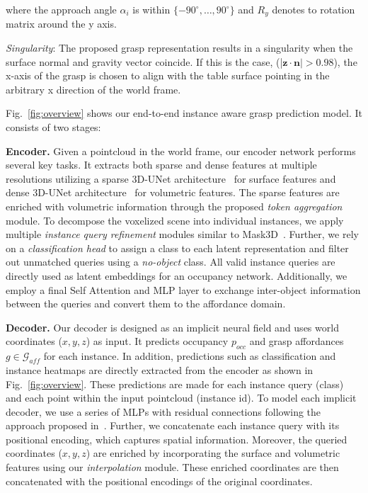 \documentclass[letterpaper, 10 pt, conference]{ieeeconf}  %
\begin{document}
where the approach angle $\alpha_i$ is within $\{-90^\circ, \dots, 90^\circ\}$ and $R_y$ denotes to rotation matrix around the y axis.

\emph{Singularity}: The proposed grasp representation results in a singularity when the surface normal and gravity vector coincide. If this is the case, (|$\mathbf{z} \cdot \mathbf{n}| > 0.98$), the x-axis of the grasp is chosen to align with the table surface pointing in the arbitrary x direction of the world frame.




\label{sec:model-arch}
Fig.~\ref{fig:overview} shows our end-to-end instance aware grasp prediction model. It consists of two stages: 

\noindent\textbf{Encoder.}
Given a pointcloud in the world frame, our encoder network performs several key tasks. It extracts both sparse and dense features at multiple resolutions utilizing a sparse 3D-UNet architecture~\cite{choy20194d} for surface features and dense 3D-UNet architecture~\cite{cciccek20163d} for volumetric features. The sparse features are enriched with volumetric information through the proposed \emph{token aggregation} module. To decompose the voxelized scene into individual instances, we apply multiple \emph{instance query refinement} modules similar to Mask3D~\cite{schult2022mask3d}.
Further, we rely on a \emph{classification head} to assign a class to each latent representation and filter out unmatched queries using a \emph{no-object} class. All valid instance queries are directly used as latent embeddings for an occupancy network. Additionally, we employ a final Self Attention and MLP layer to exchange inter-object information between the queries and convert them to the affordance domain.

\noindent\textbf{Decoder.}
Our decoder is designed as an implicit neural field and uses world coordinates ($x,y,z$) as input. It predicts occupancy $p_{occ}$ and grasp affordances $g \in \mathcal{G}_{aff}$ for each instance.
In addition, predictions such as classification and instance heatmaps are directly extracted from the encoder as shown in Fig.~\ref{fig:overview}. These predictions are made for each instance query (class) and each point within the input pointcloud (instance id). To model each implicit decoder, we use a series of MLPs with residual connections following the approach proposed in~\cite{Mescheder2018OccupancyNL}. Further, we concatenate each instance query with its positional encoding, which captures spatial information.
Moreover, the queried coordinates ($x,y,z$) are enriched by incorporating the surface and volumetric features using our \emph{interpolation} module. These enriched coordinates are then concatenated with the positional encodings of the original coordinates.
\end{document}
